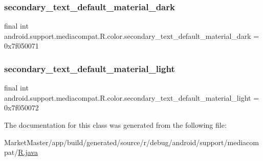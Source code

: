 \subsubsection{\texorpdfstring{secondary\+\_\+text\+\_\+default\+\_\+material\+\_\+dark}{secondary\_text\_default\_material\_dark}}
{\footnotesize\ttfamily final int android.\+support.\+mediacompat.\+R.\+color.\+secondary\+\_\+text\+\_\+default\+\_\+material\+\_\+dark = 0x7f050071\hspace{0.3cm}{\ttfamily [static]}}

\mbox{\label{classandroid_1_1support_1_1mediacompat_1_1R_1_1color_a300f378d96501458fb9fd01e2f4ea7aa}} 
\subsubsection{\texorpdfstring{secondary\+\_\+text\+\_\+default\+\_\+material\+\_\+light}{secondary\_text\_default\_material\_light}}
{\footnotesize\ttfamily final int android.\+support.\+mediacompat.\+R.\+color.\+secondary\+\_\+text\+\_\+default\+\_\+material\+\_\+light = 0x7f050072\hspace{0.3cm}{\ttfamily [static]}}



The documentation for this class was generated from the following file\+:\begin{DoxyCompactItemize}
\item 
Market\+Master/app/build/generated/source/r/debug/android/support/mediacompat/\mbox{\hyperlink{debug_2android_2support_2mediacompat_2R_8java}{R.\+java}}\end{DoxyCompactItemize}
